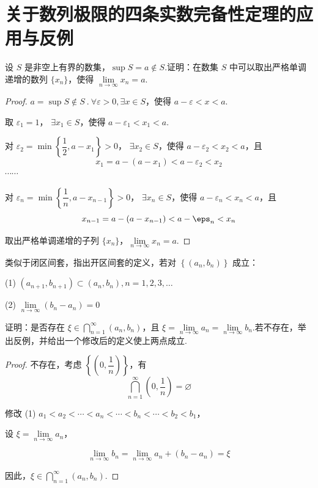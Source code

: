 \section{关于数列极限的四条实数完备性定理的应用与反例}
\begin{example}
	设 $S$ 是非空上有界的数集，$\sup S = a \notin S$.证明：在数集 $S$ 中可以取出严格单调递增的数列 $\{x_n\}$，使得 $\lim\limits_{n \to \infty} x_n = a$.
	
	
\end{example}
\begin{proof}
	$a = \sup S \notin S~$.$~\forall \varepsilon > 0, \exists x \in S$，使得 $a - \varepsilon < x < a$.
	
	取 $\varepsilon_1 = 1$， $\exists x_1 \in S$，使得 $a - \varepsilon_1 < x_1 < a$.
	
	对 $\varepsilon_2 = \min \left\{\dfrac{1}{2}, a - x_1\right\} > 0$， $\exists x_2 \in S$，使得 $a - \varepsilon_2 < x_2 < a$，且
	\[
	x_1 = a - (a - x_1) < a - \varepsilon_2 < x_2
	\]
	$\cdots\cdots$
	
	对 $\varepsilon_n = \min \left\{\dfrac{1}{n}, a - x_{n-1}\right\} > 0$， $\exists x_n \in S$，使得 $a - \varepsilon_n < x_n < a$，且
	\[
	x_{n-1} = a - (a - x_{n-1}) < a - \eps_n < x_n
	\]
	
	取出严格单调递增的子列 $\{x_n\}$，$\lim\limits_{n \to \infty} x_n = a$.
\end{proof}
\begin{example}
	类似于闭区间套，指出开区间套的定义，若对 $\left\{(a_n, b_n)\right\}$ 成立：
	
	(1) $(a_{n+1}, b_{n+1}) \subset (a_n, b_n), n=1,2,3,\ldots$
	
	(2) $\lim\limits_{n \to \infty} (b_n - a_n) = 0$
	
	证明：是否存在 $\xi \in \bigcap\limits_{n=1}^\infty (a_n, b_n)$，且 $\xi = \lim\limits_{n \to \infty} a_n = \lim\limits_{n \to \infty} b_n$.若不存在，举出反例，并给出一个修改后的定义使上两点成立.
	
	
\end{example}
\begin{proof}
	不存在，考虑 $\left\{(0,\dfrac{1}{n})\right\}$，有
	\[
	\bigcap_{n=1}^\infty \left(0, \frac{1}{n}\right) = \varnothing
	\]
	
	修改 (1) $a_1 < a_2 < \cdots < a_n < \cdots < b_n < \cdots < b_2 < b_1$，
	
	设 $\xi = \lim\limits_{n \to \infty} a_n$，
	
	\[
	\lim_{n \to \infty} b_n = \lim_{n \to \infty} a_n + (b_n - a_n) = \xi
	\]
	
	因此，$\xi \in \bigcap\limits_{n=1}^\infty (a_n, b_n)$.
\end{proof}
